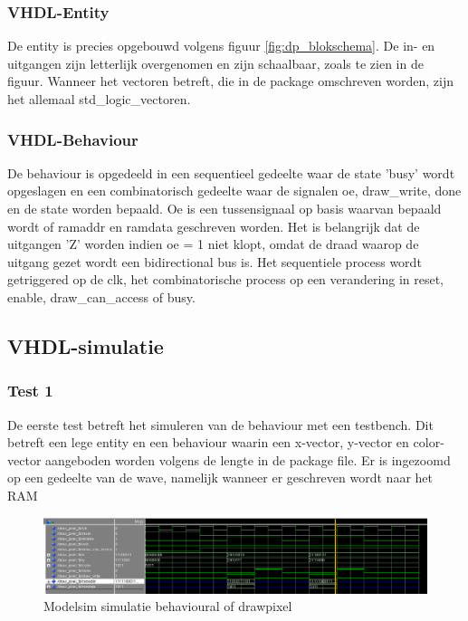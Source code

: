 \documentclass{scrartcl} %
\begin{document}
\subsubsection{VHDL-Entity}
De entity is precies opgebouwd volgens  figuur  \ref{fig:dp_blokschema}. De in- en uitgangen zijn letterlijk overgenomen en zijn schaalbaar, zoals te zien in de figuur. Wanneer het vectoren betreft, die in de package omschreven worden, zijn het allemaal std\_logic\_vectoren. 

\subsubsection{VHDL-Behaviour}
De behaviour is opgedeeld in een sequentieel gedeelte waar de state 'busy' wordt opgeslagen en een combinatorisch gedeelte waar de signalen oe, draw\_write, done en de state worden bepaald. Oe is een tussensignaal op basis waarvan bepaald wordt of ramaddr en ramdata geschreven worden. Het is belangrijk dat de uitgangen 'Z' worden indien oe = 1 niet klopt, omdat de draad waarop de uitgang gezet wordt een bidirectional bus is. Het sequentiele process wordt getriggered op de clk, het combinatorische process op een verandering in reset, enable, draw\_can\_access of busy. 

\subsection{VHDL-simulatie}
\subsubsection{Test 1}
De eerste test betreft het simuleren van de behaviour met een testbench. Dit betreft een lege entity en een behaviour waarin een x-vector, y-vector en color-vector aangeboden worden volgens de lengte in de package file.  Er is ingezoomd op een gedeelte van de wave, namelijk wanneer er geschreven wordt naar het RAM

\begin{figure} [h!]
\centering
\includegraphics [scale = 0.7] {resource/dp_sim}
\caption{Modelsim simulatie behavioural of drawpixel}
\label{fig:dp_sim}
\end{figure}
\end{document}

